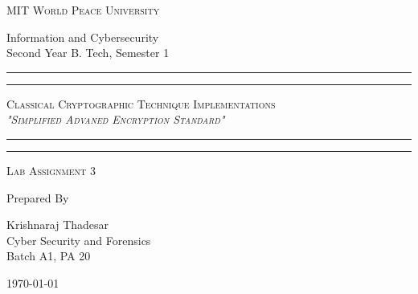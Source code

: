 \documentclass[11pt]{article}
\begin{document}
\begin{titlepage}
	\centering


	\huge\textsc{
		MIT World Peace University
	}\\

	\vspace{0.75\baselineskip} %

	\LARGE{
		Information and Cybersecurity\\
		Second Year B. Tech, Semester 1
	}

	\vfill %


	\rule{\textwidth}{1.6pt}\vspace*{-\baselineskip}\vspace*{2pt}
	\rule{\textwidth}{0.6pt}
	\vspace{0.75\baselineskip} %



	\huge{\textsc{
			Classical Cryptographic Technique Implementations\\
			\textit{"Simplified Advaned Encryption Standard"}
		}} \\



	\vspace{0.5\baselineskip} %
	\rule{\textwidth}{0.6pt}\vspace*{-\baselineskip}\vspace*{2.8pt}
	\rule{\textwidth}{1.6pt}

	\vspace{1\baselineskip} %


	\LARGE\textsc{
		Lab Assignment 3
	} %
	\vfill


	Prepared By
	\vspace{0.5\baselineskip} %

	\Large{
		Krishnaraj Thadesar \\
		Cyber Security and Forensics\\
		Batch A1, PA 20
	}


	\vspace{0.5\baselineskip} %
	\today

\end{titlepage}
\end{document}
